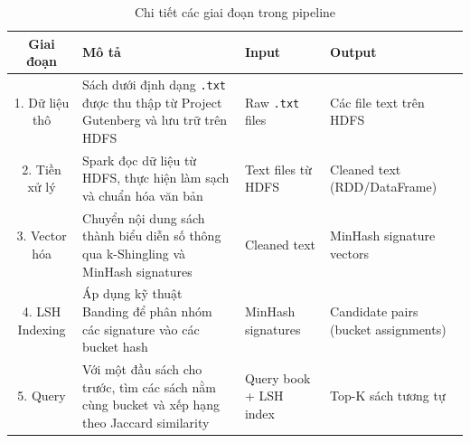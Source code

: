 \begin{table}[h!]
\centering
\caption{Chi tiết các giai đoạn trong pipeline}
\label{tab:pipeline-stages}
\begin{tabularx}{\textwidth}{|c|X|X|X|}
\hline
\textbf{Giai đoạn} & \textbf{Mô tả} & \textbf{Input} & \textbf{Output} \\
\hline
1. Dữ liệu thô & Sách dưới định dạng \texttt{.txt} được thu thập từ Project Gutenberg và lưu trữ trên HDFS & Raw \texttt{.txt} files & Các file text trên HDFS \\
\hline
2. Tiền xử lý & Spark đọc dữ liệu từ HDFS, thực hiện làm sạch và chuẩn hóa văn bản & Text files từ HDFS & Cleaned text (RDD/DataFrame) \\
\hline
3. Vector hóa & Chuyển nội dung sách thành biểu diễn số thông qua k-Shingling và MinHash signatures & Cleaned text & MinHash signature vectors \\
\hline
4. LSH Indexing & Áp dụng kỹ thuật Banding để phân nhóm các signature vào các bucket hash & MinHash signatures & Candidate pairs (bucket assignments) \\
\hline
5. Query & Với một đầu sách cho trước, tìm các sách nằm cùng bucket và xếp hạng theo Jaccard similarity & Query book + LSH index & Top-K sách tương tự \\
\hline
\end{tabularx}
\end{table}
